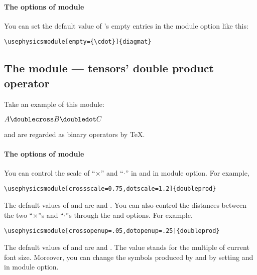 \documentclass[11pt,letterpaper]{article}
\begin{document}
\paragraph{The options of  module}
You can set the default value of 's empty entries in the module
option like this:
\begin{Verbatim}
\usephysicsmodule[empty={\cdot}]{diagmat}
\end{Verbatim}

\subsection{The  module --- tensors' double product operator}
Take an example of this module:
\begin{example}
$ A \doublecross B \doubledot C $
\end{example}
 and  are regarded as binary operators by \TeX.

\paragraph{The options of  module}
You can control the scale of ``$\times$'' and ``$\cdot$'' in 
and  in module option. For example,
\begin{Verbatim}
\usephysicsmodule[crossscale=0.75,dotscale=1.2]{doubleprod}
\end{Verbatim}
The default values of  and  are  and
. You can also control the distances between the two ``$\times$''s and
``$\cdot$''s through the  and  options.
For example,
\begin{Verbatim}
\usephysicsmodule[crossopenup=.05,dotopenup=.25]{doubleprod}
\end{Verbatim}
The default values of  and  are 
and . The value stands for the multiple of current font size.
Moreover, you can change the symbols produced by  and
 by setting  and  in module
option.
\end{document}

